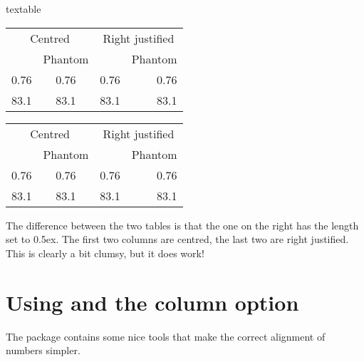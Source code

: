 \begin{tcblisting}{textable}
\centering
\begin{tabular}{cc | rr}
  \multicolumn{2}{c|}{Centred} &
  \multicolumn{2}{c}{Right justified} \\
  & Phantom & & Phantom\\
  \midrule
  0.76 & \phantom{0}0.76 & 0.76 & 0.76\\
  83.1 & 83.1\phantom{0} & 83.1 & 83.1\phantom{0}
\end{tabular}
\qquad
{\setlength{\extrarowheight}{0.5ex}
\centering
\begin{tabular}{cc|rr}
  \multicolumn{2}{c|}{Centred} &
  \multicolumn{2}{c}{Right justified} \\
  & Phantom & & Phantom\\
  \midrule
  0.76 & \phantom{0}0.76 & 0.76 & 0.76\\
  83.1 & 83.1\phantom{0} & 83.1 & 83.1\phantom{0}
\end{tabular}
}
\end{tcblisting}
\par\noindent
The difference between the two tables is that the one on the right
has the length  set to 0.5ex.
The first two columns are centred, the last two are right justified.
This is clearly a bit clumsy, but it does work!


\section{Using  and the  column option}%
\label{sec:table:siunitx}

The  package contains some nice tools that make the
correct alignment of numbers simpler. 

